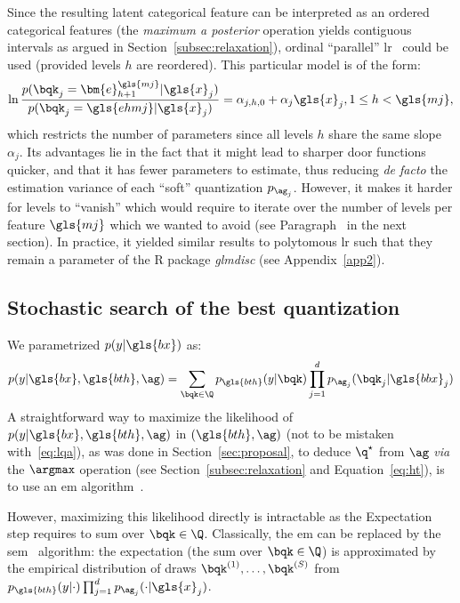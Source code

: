 Since the resulting latent categorical feature can be interpreted as an ordered categorical features (the \textit{maximum a posterior} operation yields contiguous intervals as argued in Section~\ref{subsec:relaxation}), ordinal ``parallel'' \gls{lr}~\cite{o2006logistic} could be used (provided levels $h$ are reordered). This particular model is of the form:
\[ \ln \frac{p(\bqk_{j} = \bm{e}_{h+1}^{\gls{mj}} | \gls{x}_j)}{p(\bqk_{j} = \gls{ehmj} | \gls{x}_j)} = \alpha_{j,h,0} + \alpha_{j} \gls{x}_j, 1 \leq h < \gls{mj}, \]
which restricts the number of parameters since all levels $h$ share the same slope $\alpha_j$. Its advantages lie in the fact that it might lead to sharper door functions quicker, and that it has fewer parameters to estimate, thus reducing \textit{de facto} the estimation variance of each ``soft'' quantization $p_{\ag_j}$. However, it makes it harder for levels to ``vanish'' which would require to iterate over the number of levels per feature $\gls{mj}$ which we wanted to avoid (see Paragraph~ in the next section). In practice, it yielded similar results to polytomous \gls{lr} such that they remain a parameter of the \textsf{R} package \textit{glmdisc} (see Appendix~\ref{app2}).

\subsection{Stochastic search of the best quantization} \label{subsec:stoch}

We parametrized $p(y|\gls{bx})$ as:
\begin{equation}
p(y | \gls{bx}, \gls{bth}, \ag) = \sum_{\bqk \in \Q} p_{\gls{bth}}(y | \bqk) \prod_{j=1}^d p_{\ag_j}(\bqk_j | \gls{bbx}_j)
\end{equation}
A straightforward way to maximize the likelihood of $p(y | \gls{bx}, \gls{bth}, \ag)$ in $(\gls{bth}, \ag)$ (not to be mistaken with~\eqref{eq:lqa}), as was done in Section~\ref{sec:proposal}, to deduce $\q^\star$ from $\ag$ \textit{via} the $\argmax$ operation (see Section~\ref{subsec:relaxation} and Equation~\eqref{eq:ht}), is to use an \gls{em} algorithm~\cite{dempster1977maximum}.

However, maximizing this likelihood directly is intractable as the Expectation step requires to sum over $\bqk \in \Q$. Classically, the \gls{em} can be replaced by the \acrlong{sem}~\cite{celeux1985sem} algorithm: the expectation (the sum over $\bqk \in \Q$) is approximated by the empirical distribution of draws $\bqk^{(1)}, \dots, \bqk^{(S)}$ from $p_{\gls{bth}}(y | \cdot) \prod_{j=1}^d p_{\ag_j}(\cdot | \gls{x}_j)$.

